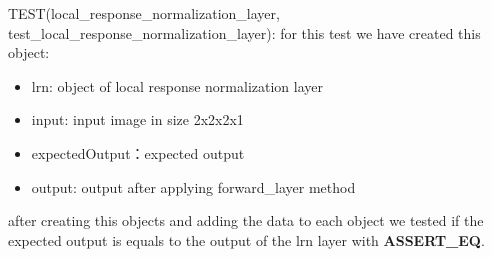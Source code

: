 \documentclass[parskip=full]{scrartcl}
\newcommand\tab[1][1cm]{\hspace*{#1}}
\begin{document}
   \tab TEST(local_response_normalization_layer, test_local_response_normalization_layer): for this test we have created this object:
   
   \begin{itemize}
       \item lrn: object of local response normalization layer
       \item input: input image in size 2x2x2x1
       \item expectedOutput：expected output
       \item output: output after applying forward_layer method 
   \end{itemize}
   
   \tab after creating this objects and adding the data to each object we tested if the expected output is equals to the output of the lrn layer with \textbf{ASSERT_EQ}.
   
   
\end{document}
